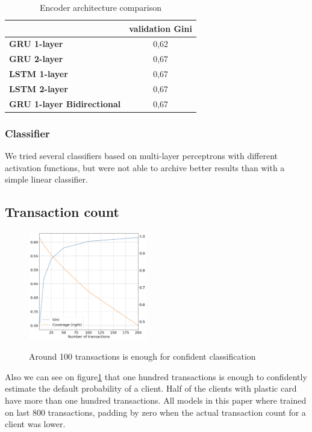 \documentclass{sigkddExp}
\begin{document}
\begin{table}
\caption{Encoder architecture comparison}
\begin{tabular}{ | l | c |  }
\hline
& \textbf{validation Gini} \\
\hline
\textbf{GRU 1-layer} & 0,62  \\
\textbf{GRU 2-layer} & 0,67  \\
\textbf{LSTM 1-layer} & 0,67  \\
\textbf{LSTM 2-layer} & 0,67  \\
\textbf{GRU 1-layer Bidirectional} & 0,67  \\
\hline
\end{tabular}
\label{tab3}
\end{table}

\subsubsection{Classifier}

We tried several classifiers based on multi-layer perceptrons with different activation functions, but were not able to archive better results than with a simple linear classifier.

\subsection{Transaction count}

\begin{figure}
  \caption{Around 100 transactions is enough for confident classification}
  \includegraphics[width=0.46\textwidth]{information-vs-accuracy.png}
  \label{fig2}
\end{figure}

Also we can see on figure\ref{fig2} that one hundred transactions is enough to confidently estimate the default probability of a client. Half of the clients with plastic card have more than one hundred transactions. All models in this paper where trained on last 800 transactions, padding by zero when the actual transaction count for a client was lower.
\end{document}

